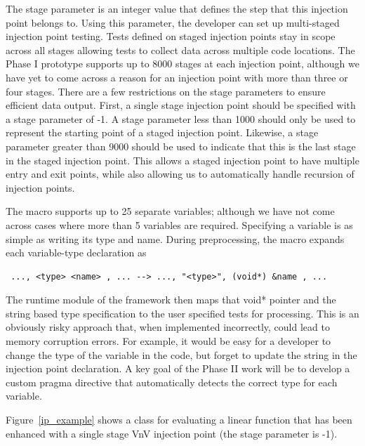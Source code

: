 The stage parameter is an integer value that defines the step that this injection point belongs to. Using this parameter, the developer can set up multi-staged injection point testing. Tests defined on staged injection points stay in scope across all stages allowing tests to collect data across multiple code locations. The Phase I prototype supports up to 8000 stages at each injection point, although we have yet to come across a reason for an injection point with more than three or four stages. There are a few restrictions on the stage parameters to ensure efficient data output. First, a single stage injection point should be specified with a stage parameter of -1. A stage parameter less than 1000 should only be used to represent the starting point of a staged injection point. Likewise, a stage parameter greater than 9000 should be used to indicate that this is the last stage in the staged injection point. This allows a staged injection point to have multiple entry and exit points, while also allowing us to automatically handle recursion of injection points.  

The macro supports up to 25 separate variables; although we have not come across cases where more than 5 variables are required. Specifying a variable is as simple 
as writing its type and name. During preprocessing, the macro expands each variable-type declaration as 
\begin{verbatim}
 ..., <type> <name> , ... --> ..., "<type>", (void*) &name , ... 
\end{verbatim}

The runtime module of the framework then maps that void* pointer and the string based type specification to the user specified tests for processing. This is an obviously risky approach that, when implemented incorrectly, could lead to memory corruption errors. For example, it would be easy for a developer to change the type of the variable in the code, but forget to update the string in the injection point declaration. A key goal of the Phase II work will be to develop a custom pragma directive that automatically detects the correct type for each variable. 

Figure~\ref{ip_example} shows a class for evaluating a linear function that has been enhanced with a single stage VnV injection point (the stage parameter is -1). 


